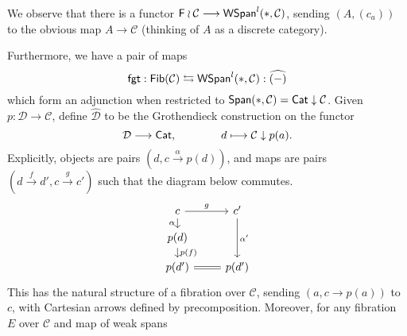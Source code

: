 \documentclass[a4paper,10pt
,draft
]{article}%
\renewcommand{\1}{\ensuremath{\mathbb{id}}}
\renewcommand{\hat}{\widehat}
\begin{document}
\begin{remark}      
      We observe that there is a functor $\mathsf F \wr \mathcal C \longto \mathsf{WSpan}^l(\**, \mathcal C)$,
      sending $(A, (c_a))$ to the obvious map $A \to \mathcal C$ (thinking of $A$ as a discrete category).

      Furthermore, we have a pair of maps
      \begin{equation}
            \mathsf{fgt}: \mathsf{Fib}(\mathcal C) \leftrightarrows \mathsf{WSpan}^l(\**, \mathcal C) : \widehat{(-)}
      \end{equation}
      which form an adjunction when restricted to $\mathsf{Span}(\**, \mathcal C) = \mathsf{Cat} \downarrow \mathcal C$.
      Given $p: \mathcal D \to \mathcal C$, define $\hat{\mathcal D}$ to be the Grothendieck construction on the functor
      \begin{equation}
            \mathcal D \longrightarrow \mathsf{Cat},
            \qquad \qquad
            d \longmapsto \mathcal C \downarrow p(a).
      \end{equation}
      Explicitly, objects are pairs $(d, c \xrightarrow{\alpha} p(d))$,
      and maps are pairs $(d \xrightarrow{f} d', c \xrightarrow{g} c')$ such that the diagram below commutes.
      \begin{equation}
            \begin{tikzcd}[row sep = small]
                  c \arrow[r, "g"] \arrow[d, "\alpha"']
                  &
                  c' \arrow[dd, "{\alpha'}"]
                  \\
                  p(d) \arrow[d, "{p(f)}"]
                  \\
                  p(d') \arrow[r, equal]
                  &
                  p(d')
            \end{tikzcd}
      \end{equation}
      This has the natural structure of a fibration over $\mathcal C$,
      sending $(a, c \to p(a))$ to $c$, with
      Cartesian arrows defined by precomposition.
      Moreover, for any fibration $E$ over $\mathcal C$ and map of weak spans
      \begin{equation}

\end{equation}
\end{remark}
\end{document}
